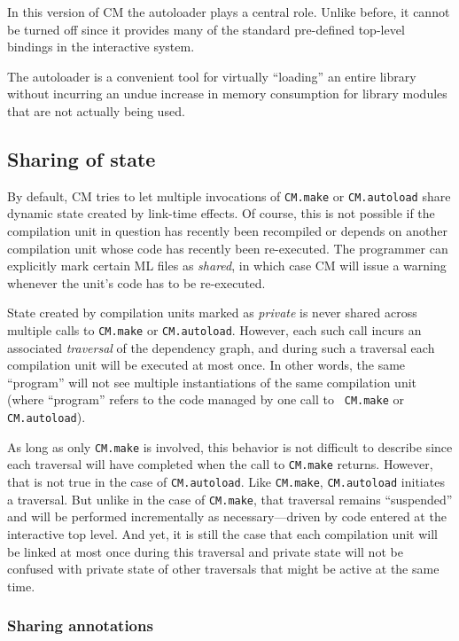 \documentclass{article}
\begin{document}
In this version of CM the autoloader plays a central role.  Unlike
before, it cannot be turned off since it provides many of the standard
pre-defined top-level bindings in the interactive system.

The autoloader is a convenient tool for virtually ``loading'' an
entire library without incurring an undue increase in memory
consumption for library modules that are not actually being used.

\subsection{Sharing of state}
\label{sec:sharing}

By default, CM tries to let multiple invocations of {\tt CM.make} or
{\tt CM.autoload} share dynamic state created by link-time effects.
Of course, this is not possible if the compilation unit in question
has recently been recompiled or depends on another compilation unit
whose code has recently been re-executed.  The programmer can
explicitly mark certain ML files as {\em shared}, in which case CM
will issue a warning whenever the unit's code has to be re-executed.

State created by compilation units marked as {\em private} is never
shared across multiple calls to {\tt CM.make} or {\tt CM.autoload}.
However, each such call incurs an associated {\em traversal} of the
dependency graph, and during such a traversal each compilation unit
will be executed at most once.  In other words, the same ``program''
will not see multiple instantiations of the same compilation unit
(where ``program'' refers to the code managed by one call to {\tt
CM.make} or {\tt CM.autoload}).

As long as only {\tt CM.make} is involved, this behavior is not
difficult to describe since each traversal will have completed when
the call to {\tt CM.make} returns.  However, that is not true in the
case of {\tt CM.autoload}.  Like {\tt CM.make}, {\tt CM.autoload}
initiates a traversal. But unlike in the case of {\tt CM.make}, that
traversal remains ``suspended'' and will be performed incrementally as
necessary---driven by code entered at the interactive top level.  And
yet, it is still the case that each compilation unit will be linked at
most once during this traversal and private state will not be confused
with private state of other traversals that might be active at the
same time.


\subsubsection*{Sharing annotations}
\end{document}
